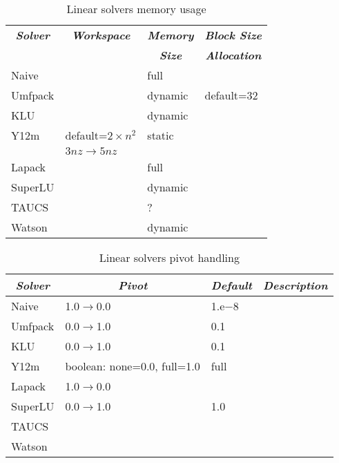 \begin{table}
\centering
\caption{Linear solvers memory usage}\label{tab:linear-solvers-memory}
\begin{tabular}{llll}
\hline
	\multicolumn{1}{c}{\textbf{\emph{Solver}}} &
	\multicolumn{1}{c}{\textbf{\emph{Workspace}}} &
	\multicolumn{1}{c}{\textbf{\emph{Memory}}} &
	\multicolumn{1}{c}{\textbf{\emph{Block Size}}} \\
	&
	&
	\multicolumn{1}{c}{\textbf{\emph{Size}}} &
	\multicolumn{1}{c}{\textbf{\emph{Allocation}}} \\
\hline\hline
	Naive		& 			& full		&		\\
	Umfpack 	& 			& dynamic	& default=32	\\
	KLU 		& 			& dynamic	& 		\\
	Y12m 		& default=$2\times{n^2}$& static	&		\\
			& $3nz \rightarrow 5nz$	&		&		\\
	Lapack		&			& full		&		\\
	SuperLU		& 			& dynamic 	&		\\
	TAUCS		&			& ?		&		\\
	Watson		&			& dynamic	&		\\
\hline
\end{tabular}
\end{table}

\begin{table}
\centering
\caption{Linear solvers pivot handling}\label{tab:linear-solvers-pivot}
\begin{tabular}{llll}
\hline
	\multicolumn{1}{c}{\textbf{\emph{Solver}}} &
	\multicolumn{1}{c}{\textbf{\emph{Pivot}}} &
	\multicolumn{1}{c}{\textbf{\emph{Default}}} &
	\multicolumn{1}{c}{\textbf{\emph{Description}}} \\
\hline\hline
	Naive		& 1.0$\rightarrow$0.0		& 1.e$-8$	& \\
	Umfpack 	& 0.0$\rightarrow$1.0 		& 0.1 		& \\
	KLU 		& 0.0$\rightarrow$1.0 		& 0.1 		& \\
	Y12m 		& boolean: none=0.0, full=1.0	& full		& \\
	Lapack		& 1.0$\rightarrow$0.0		&		& \\
	SuperLU		& 0.0$\rightarrow$1.0		& 1.0		& \\
	TAUCS		&				&		& \\
	Watson		&				&		& \\
\hline
\end{tabular}
\end{table}




